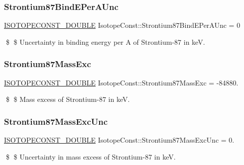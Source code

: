 \subsubsection{\texorpdfstring{Strontium87\+Bind\+E\+Per\+A\+Unc}{Strontium87BindEPerAUnc}}
{\footnotesize\ttfamily \mbox{\hyperlink{group___isotope_const-_macros_ga8f45a7272ce02c0b4c65c44636ed719a}{I\+S\+O\+T\+O\+P\+E\+C\+O\+N\+S\+T\+\_\+\+D\+O\+U\+B\+LE}} Isotope\+Const\+::\+Strontium87\+Bind\+E\+Per\+A\+Unc = 0}

\$ \$ Uncertainty in binding energy per A of Strontium-\/87 in keV. \mbox{\label{group___isotope_const-_strontium-_sr87_gaacc47cb2da7d87a82bb42871e51fcf4a}} 
\subsubsection{\texorpdfstring{Strontium87\+Mass\+Exc}{Strontium87MassExc}}
{\footnotesize\ttfamily \mbox{\hyperlink{group___isotope_const-_macros_ga8f45a7272ce02c0b4c65c44636ed719a}{I\+S\+O\+T\+O\+P\+E\+C\+O\+N\+S\+T\+\_\+\+D\+O\+U\+B\+LE}} Isotope\+Const\+::\+Strontium87\+Mass\+Exc = -\/84880.}

\$ \$ Mass excess of Strontium-\/87 in keV. \mbox{\label{group___isotope_const-_strontium-_sr87_ga49ad281c383d04eff98567e615a3c026}} 
\subsubsection{\texorpdfstring{Strontium87\+Mass\+Exc\+Unc}{Strontium87MassExcUnc}}
{\footnotesize\ttfamily \mbox{\hyperlink{group___isotope_const-_macros_ga8f45a7272ce02c0b4c65c44636ed719a}{I\+S\+O\+T\+O\+P\+E\+C\+O\+N\+S\+T\+\_\+\+D\+O\+U\+B\+LE}} Isotope\+Const\+::\+Strontium87\+Mass\+Exc\+Unc = 0.}

\$ \$ Uncertainty in mass excess of Strontium-\/87 in keV. \mbox{\label{group___isotope_const-_strontium-_sr87_gad61788ba5b52ec314c4c22c4257c0f5f}} 
